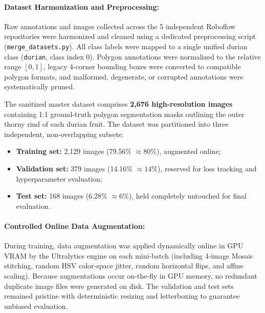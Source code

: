 \documentclass[12pt,a4paper]{article}
\begin{document}
\paragraph{Dataset Harmonization and Preprocessing:}
Raw annotations and images collected across the 5 independent Roboflow repositories were harmonized and cleaned using a dedicated preprocessing script (\texttt{merge\_datasets.py}). All class labels were mapped to a single unified durian class (\texttt{durian}, class index 0). Polygon annotations were normalized to the relative range $[0, 1]$, legacy 4-corner bounding boxes were converted to compatible polygon formats, and malformed, degenerate, or corrupted annotations were systematically pruned.

The sanitized master dataset comprises \textbf{2,676 high-resolution images} containing 1:1 ground-truth polygon segmentation masks outlining the outer thorny rind of each durian fruit. The dataset was partitioned into three independent, non-overlapping subsets:
\begin{itemize}
    \item \textbf{Training set:} 2,129 images (79.56\% $\approx 80\%$), augmented online;
    \item \textbf{Validation set:} 379 images (14.16\% $\approx 14\%$), reserved for loss tracking and hyperparameter evaluation;
    \item \textbf{Test set:} 168 images (6.28\% $\approx 6\%$), held completely untouched for final evaluation.
\end{itemize}

\paragraph{Controlled Online Data Augmentation:}
During training, data augmentation was applied dynamically online in GPU VRAM by the Ultralytics engine on each mini-batch (including 4-image Mosaic stitching, random HSV color-space jitter, random horizontal flips, and affine scaling). Because augmentations occur on-the-fly in GPU memory, no redundant duplicate image files were generated on disk. The validation and test sets remained pristine with deterministic resizing and letterboxing to guarantee unbiased evaluation.
\end{document}
